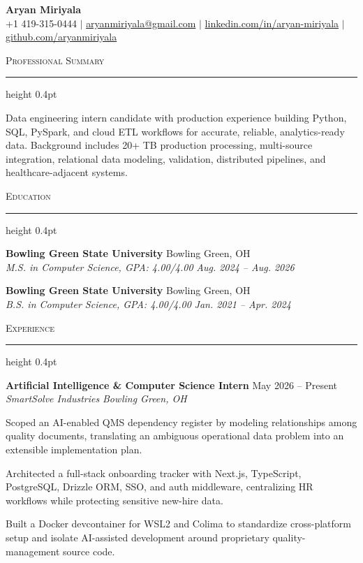 \documentclass[letterpaper,11pt]{article}
\newcommand{\resumesection}[1]{%
  \par\vspace{2pt}%
  {\large\scshape #1}\par\vspace{2pt}%
  \hrule height 0.4pt\vspace{2pt}%
}
\newcommand{\resumeSubheading}[4]{
  \textbf{#1} \hfill #2\\
  \textit{#3} \hfill \textit{#4}
}
\begin{document}
\begin{center}
  {\LARGE \textbf{Aryan Miriyala}}\\[-1pt]
  \small
  +1 419-315-0444 $|$
  \href{mailto:aryanmiriyala@gmail.com}{aryanmiriyala@gmail.com} $|$
  \href{https://www.linkedin.com/in/aryan-miriyala-7788a21b6/}{linkedin.com/in/aryan-miriyala} $|$
  \href{https://github.com/aryanmiriyala}{github.com/aryanmiriyala}
\end{center}\vspace{-10pt}

\resumesection{Professional Summary}
Data engineering intern candidate with production experience building Python, SQL, PySpark, and cloud ETL workflows for accurate, reliable, analytics-ready data. Background includes 20+ TB production processing, multi-source integration, relational data modeling, validation, distributed pipelines, and healthcare-adjacent systems.

\resumesection{Education}
\resumeSubheading
{Bowling Green State University}{Bowling Green, OH}
{M.S. in Computer Science, GPA: 4.00/4.00}{Aug. 2024 -- Aug. 2026}

\resumeSubheading
{Bowling Green State University}{Bowling Green, OH}
{B.S. in Computer Science, GPA: 4.00/4.00}{Jan. 2021 -- Apr. 2024}

\resumesection{Experience}
\resumeSubheading
{Artificial Intelligence \& Computer Science Intern}{May 2026 -- Present}
{SmartSolve Industries}{Bowling Green, OH}
\begin{tightitemize}
  \item Scoped an AI-enabled QMS dependency register by modeling relationships among quality documents, translating an ambiguous operational data problem into an extensible implementation plan.
  \item Architected a full-stack onboarding tracker with Next.js, TypeScript, PostgreSQL, Drizzle ORM, SSO, and auth middleware, centralizing HR workflows while protecting sensitive new-hire data.
  \item Built a Docker devcontainer for WSL2 and Colima to standardize cross-platform setup and isolate AI-assisted development around proprietary quality-management source code.
\end{tightitemize}
\end{document}
